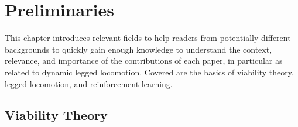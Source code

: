 
\chapter{Preliminaries} \label{chap:prelims}
This chapter introduces relevant fields to help readers from potentially different backgrounds to quickly gain enough knowledge to understand the context, relevance, and importance of the contributions of each paper, in particular as related to dynamic legged locomotion. Covered are the basics of viability theory, legged locomotion, and reinforcement learning.

\section{Viability Theory}


